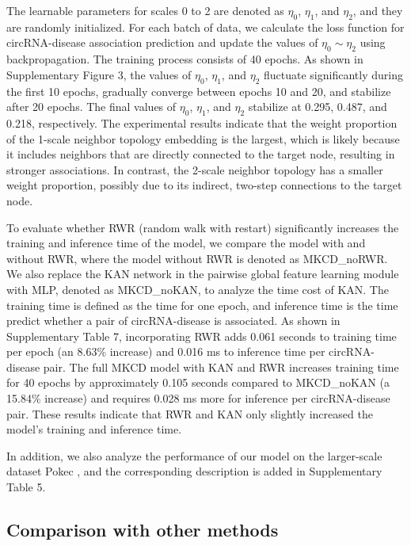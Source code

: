 \documentclass[journal,twoside,web]{ieeecolor}
\begin{document}
The learnable parameters for scales 0 to 2 are denoted as $\eta_{0}$, $\eta_{1}$, and $\eta_{2}$, and they are randomly initialized. For each batch of data, we calculate the loss function for circRNA-disease association prediction and update the values of $\eta_{0}\sim\eta_{2}$ using backpropagation. The training process consists of 40 epochs. As shown in Supplementary Figure 3, the values of $\eta_{0}$, $\eta_{1}$, and $\eta_{2}$ fluctuate significantly during the first 10 epochs, gradually converge between epochs 10 and 20, and stabilize after 20 epochs. The final values of $\eta_{0}$, $\eta_{1}$, and $\eta_{2}$ stabilize at 0.295, 0.487, and 0.218, respectively. The experimental results indicate that the weight proportion of the 1-scale neighbor topology embedding is the largest, which is likely because it includes neighbors that are directly connected to the target node, resulting in stronger associations. In contrast, the 2-scale neighbor topology has a smaller weight proportion, possibly due to its indirect, two-step connections to the target node.%

To evaluate whether RWR (random walk with restart) significantly increases the training and inference time of the model, we compare the model with and without RWR, where the model without RWR is denoted as MKCD\_noRWR. We also replace the KAN network in the pairwise global feature learning module with MLP, denoted as MKCD\_noKAN, to analyze the time cost of KAN. The training time is defined as the time for one epoch, and inference time is the time predict whether a pair of circRNA-disease is associated. As shown in Supplementary Table 7, incorporating RWR adds 0.061 seconds to training time per epoch (an 8.63\% increase) and 0.016 ms to inference time per circRNA-disease pair. The full MKCD model with KAN and RWR increases training time for 40 epochs by approximately 0.105 seconds compared to MKCD\_noKAN (a 15.84\% increase) and requires 0.028 ms more for inference per circRNA-disease pair. These results indicate that RWR and KAN only slightly increased the model's training and inference time.%

In addition, we also analyze the performance of our model on the larger-scale dataset Pokec \cite{takac2012data}, and the corresponding description is added in Supplementary Table 5.

\subsection{Comparison with other methods}
\end{document}
